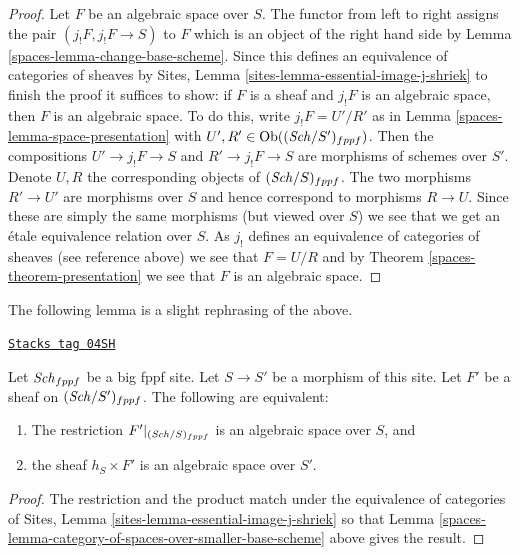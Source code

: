 \begin{proof}

Let $F$ be an algebraic space over $S$. The functor from left to right
assigns the pair $(j_!F, j_!F \to S)$ to $F$
which is an object of the right hand side by
Lemma \ref{spaces-lemma-change-base-scheme}.
Since this defines an equivalence of categories of sheaves by
Sites, Lemma \ref{sites-lemma-essential-image-j-shriek}
to finish the proof it suffices to show:
if $F$ is a sheaf and $j_!F$ is an algebraic space, then $F$
is an algebraic space. To do this, write
$j_!F = U'/R'$ as in
Lemma \ref{spaces-lemma-space-presentation}
with $U', R' \in \operatorname{Ob}((\mathit{Sch}/S')_{fppf})$.
Then the compositions $U' \to j_!F \to S$ and $R' \to j_!F \to S$
are morphisms of schemes over $S'$. Denote $U, R$ the corresponding
objects of $(\mathit{Sch}/S)_{fppf}$. The two morphisms
$R' \to U'$ are morphisms over $S$ and hence correspond to
morphisms $R \to U$. Since these are simply the same
morphisms (but viewed over $S$) we see that we get an \'etale
equivalence relation over $S$. As $j_!$ defines an equivalence of
categories of sheaves (see reference above) we see that
$F = U/R$ and by
Theorem \ref{spaces-theorem-presentation}
we see that $F$ is an algebraic space.
\end{proof}

The following lemma is a slight rephrasing of the above.

\begin{lemma}[Rephrase]
\label{spaces-lemma-rephrase}
\href{https://stacks.math.columbia.edu/tag/04SH}{\texttt{Stacks tag 04SH}}

Let $\mathit{Sch}_{fppf}$ be a big fppf site.
Let $S \to S'$ be a morphism of this site.
Let $F'$ be a sheaf on $(\mathit{Sch}/S')_{fppf}$.
The following are equivalent:
\begin{enumerate}
\item The restriction $F'|_{(\mathit{Sch}/S)_{fppf}}$
is an algebraic space over $S$, and
\item the sheaf $h_S \times F'$ is an algebraic space over $S'$.
\end{enumerate}
\end{lemma}

\begin{proof}

The restriction and the product match under
the equivalence of categories of
Sites, Lemma \ref{sites-lemma-essential-image-j-shriek}
so that
Lemma \ref{spaces-lemma-category-of-spaces-over-smaller-base-scheme}
above gives the result.
\end{proof}

